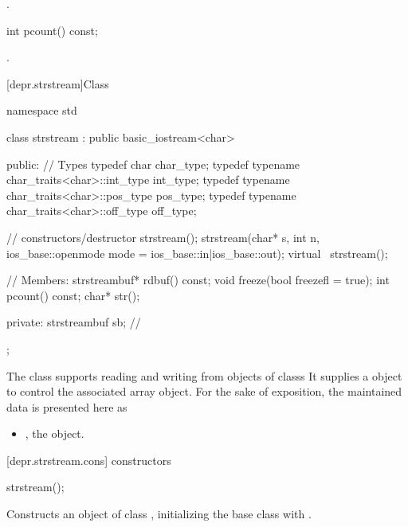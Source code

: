 \begin{itemdescr}
\pnum
\returns
{}.
\end{itemdescr}

%
\begin{itemdecl}
int pcount() const;
\end{itemdecl}

\begin{itemdescr}
\pnum
\returns
{}.
\end{itemdescr}

[depr.strstream]{Class }

%
\begin{codeblock}
namespace std {
  class strstream
    : public basic_iostream<char> {
  public:
    // Types
    typedef char                                char_type;
    typedef typename char_traits<char>::int_type int_type;
    typedef typename char_traits<char>::pos_type pos_type;
    typedef typename char_traits<char>::off_type off_type;

    // constructors/destructor
    strstream();
    strstream(char* s, int n,
              ios_base::openmode mode = ios_base::in|ios_base::out);
    virtual ~strstream();

    // Members:
    strstreambuf* rdbuf() const;
    void freeze(bool freezefl = true);
    int pcount() const;
    char* str();

  private:
  strstreambuf sb;  // \exposr
  };
}
\end{codeblock}

\pnum
The class
supports reading and writing from objects of classs
It supplies a
object to control the associated array object.
For the sake of exposition, the maintained data is presented here as
\begin{itemize}
\item
{}, the
object.
\end{itemize}

[depr.strstream.cons]{ constructors}

%
\begin{itemdecl}
strstream();
\end{itemdecl}

\begin{itemdescr}
\pnum
\effects
Constructs an object of class
,
initializing the base class with
.
\end{itemdescr}

